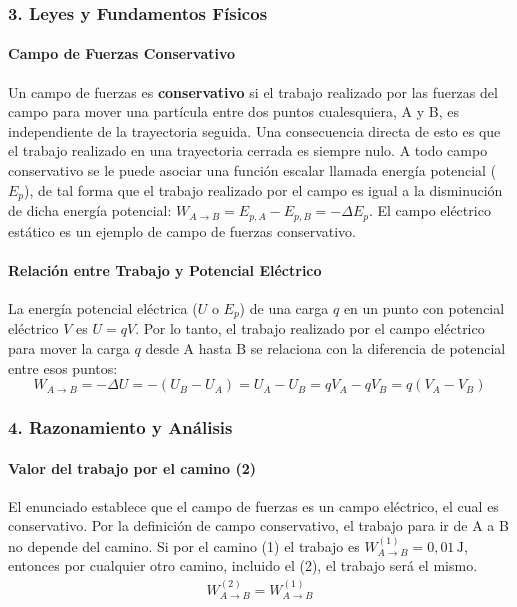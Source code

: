 \subsubsection*{3. Leyes y Fundamentos Físicos}
\paragraph*{Campo de Fuerzas Conservativo}
Un campo de fuerzas es \textbf{conservativo} si el trabajo realizado por las fuerzas del campo para mover una partícula entre dos puntos cualesquiera, A y B, es independiente de la trayectoria seguida. Una consecuencia directa de esto es que el trabajo realizado en una trayectoria cerrada es siempre nulo. A todo campo conservativo se le puede asociar una función escalar llamada energía potencial ($E_p$), de tal forma que el trabajo realizado por el campo es igual a la disminución de dicha energía potencial: $W_{A \to B} = E_{p,A} - E_{p,B} = -\Delta E_p$. El campo eléctrico estático es un ejemplo de campo de fuerzas conservativo.

\paragraph*{Relación entre Trabajo y Potencial Eléctrico}
La energía potencial eléctrica ($U$ o $E_p$) de una carga $q$ en un punto con potencial eléctrico $V$ es $U=qV$. Por lo tanto, el trabajo realizado por el campo eléctrico para mover la carga $q$ desde A hasta B se relaciona con la diferencia de potencial entre esos puntos:
$$ W_{A \to B} = -\Delta U = -(U_B - U_A) = U_A - U_B = qV_A - qV_B = q(V_A - V_B) $$

\subsubsection*{4. Razonamiento y Análisis}
\paragraph*{Valor del trabajo por el camino (2)}
El enunciado establece que el campo de fuerzas es un campo eléctrico, el cual es conservativo. Por la definición de campo conservativo, el trabajo para ir de A a B no depende del camino. Si por el camino (1) el trabajo es $W_{A \to B}^{(1)} = 0,01 \, \text{J}$, entonces por cualquier otro camino, incluido el (2), el trabajo será el mismo.
\begin{gather}
    W_{A \to B}^{(2)} = W_{A \to B}^{(1)}
\end{gather}


